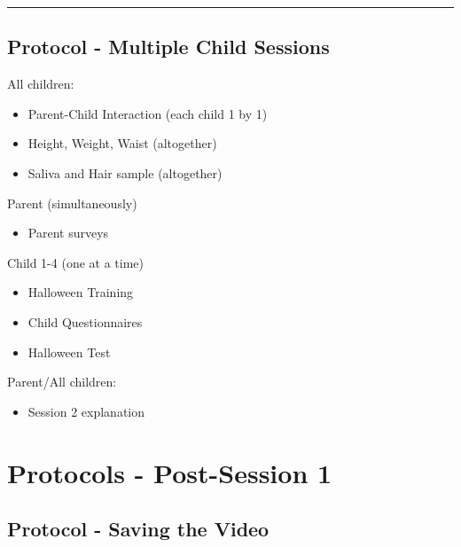 \documentclass[]{book}
\providecommand{\tightlist}{%
  \setlength{\itemsep}{0pt}\setlength{\parskip}{0pt}}
\begin{document}
\begin{center}\rule{0.5\linewidth}{0.5pt}\end{center}

\hypertarget{protocol---multiple-child-sessions-2}{%
\subsection{Protocol - Multiple Child Sessions}\label{protocol---multiple-child-sessions-2}}

All children:

\begin{itemize}
\item
  Parent-Child Interaction (each child 1 by 1)
\item
  Height, Weight, Waist (altogether)
\item
  Saliva and Hair sample (altogether)
\end{itemize}

Parent (simultaneously)

\begin{itemize}
\tightlist
\item
  Parent surveys
\end{itemize}

Child 1-4 (one at a time)

\begin{itemize}
\item
  Halloween Training
\item
  Child Questionnaires
\item
  Halloween Test
\end{itemize}

Parent/All children:

\begin{itemize}
\tightlist
\item
  Session 2 explanation
\end{itemize}

\hypertarget{protocols---post-session-1-2}{%
\section{Protocols - Post-Session 1}\label{protocols---post-session-1-2}}

\hypertarget{protocol---saving-the-video-2}{%
\subsection{Protocol - Saving the Video}\label{protocol---saving-the-video-2}}
\end{document}
